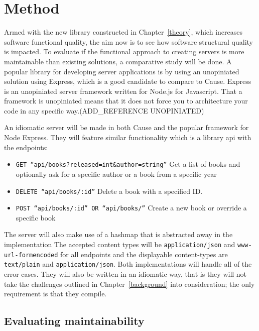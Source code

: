 \chapter{Method}\label{method}

Armed with the new library constructed in Chapter~\ref{theory}, which increases
software functional quality, the aim now is to see how software structural
quality is impacted.  To evaluate if the functional approach to creating servers
is more maintainable than existing solutions, a comparative study will be done.
A popular library for developing server applications is by using an unopiniated
solution using Express, which is a good candidate to compare to Cause. Express
is an unopiniated server framework written for Node.js for Javascript.  That a
framework is unopiniated means that it does not force you to architecture your
code in any specific way.(ADD\_REFERENCE UNOPINIATED)

An idiomatic server will be made in both Cause and the popular framework for
Node Express. They will feature similar functionality which is a library api
with the endpoints:

\begin{itemize}
    \item \texttt{GET ``api/books?released=int\&author=string''} Get a list of
    books and optionally ask for a specific author or a book from a specific
    year
    \item \texttt{DELETE ``api/books/:id''} Delete a book with a specified ID.
    \item \texttt{POST ``api/books/:id'' OR ``api/books/''} Create a new book or
    override a specific book
\end{itemize}

The server will also make use of a hashmap that is abstracted away in the
implementation The accepted content types will be \texttt{application/json} and
\texttt{www-url-formencoded} for all endpoints and the displayable content-types
are \texttt{text/plain} and \texttt{application/json}. Both implementations will
handle all of the error cases. They will also be written in an idiomatic way,
that is they will not take the challenges outlined in Chapter~\ref{background}
into consideration; the only requirement is that they compile.

\section{Evaluating maintainability}\label{evaluatingmaintainability}

